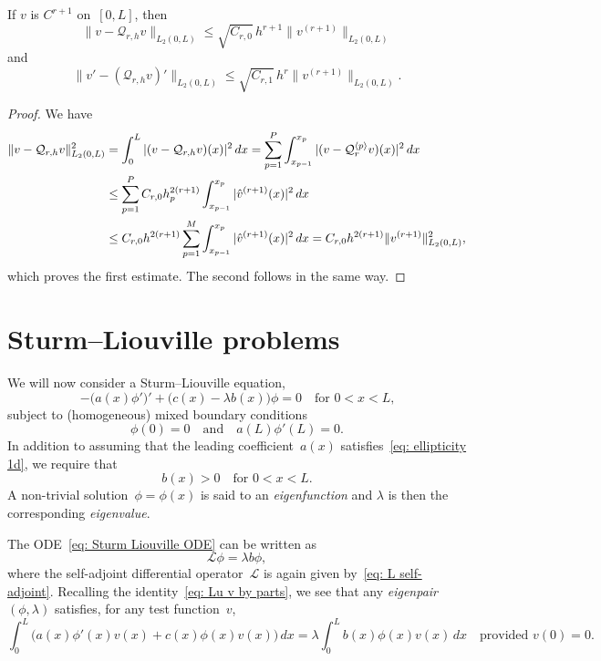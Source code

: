 \begin{theorem}
If $v$ is $C^{r+1}$ on~$[0,L]$, then
\[
\|v-\mathcal{Q}_{r,h}v\|_{L_2(0,L)}
    \le\sqrt{C_{r,0}}\,h^{r+1}\|v^{(r+1)}\|_{L_2(0,L)}
\]
and
\[
\|v'-(\mathcal{Q}_{r,h}v)'\|_{L_2(0,L)}
    \le\sqrt{C_{r,1}}\,h^r\|v^{(r+1)}\|_{L_2(0,L)}.
\]
\end{theorem}
\begin{proof}
We have
\begin{align*}
\|v-\mathcal{Q}_{r,h}v\|_{L_2(0,L)}^2
    &=\int_0^L|(v-\mathcal{Q}_{r,h}v)(x)|^2\,dx=\sum_{p=1}^P
    \int_{x_{p-1}}^{x_p}|(v-\mathcal{Q}_r^{\langle p\rangle}v)(x)|^2\,dx\\
    &\le\sum_{p=1}^P C_{r,0}h_p^{2(r+1)}\int_{x_{p-1}}^{x_p}
        |\hat v^{(r+1)}(x)|^2\,dx\\
    &\le C_{r,0}h^{2(r+1)}\sum_{p=1}^M\int_{x_{p-1}}^{x_p} 
        |\hat v^{(r+1)}(x)|^2\,dx
    =C_{r,0}h^{2(r+1)}\|v^{(r+1)}\|_{L_2(0,L)}^2,
\end{align*}
which proves the first estimate.  The second follows in the same way.
\end{proof}

\section{Sturm--Liouville problems}\label{sec: Sturm-Liouville}

We will now consider a Sturm--Liouville equation,
\begin{equation}\label{eq: Sturm Liouville ODE}
-\bigl(a(x)\phi'\bigr)'+\bigl(c(x)-\lambda b(x)\bigr)\phi=0\quad
	\text{for $0<x<L$,}
\end{equation}
subject to (homogeneous) mixed boundary conditions
\begin{equation}\label{eq: Sturm Liouville bc}
\phi(0)=0\quad\text{and}\quad a(L)\phi'(L)=0.
\end{equation}
In addition to assuming that the leading coefficient~$a(x)$ 
satisfies~\eqref{eq: ellipticity 1d}, we require that
\begin{equation}\label{eq: b>0}
b(x)>0\quad\text{for $0<x<L$.}
\end{equation}
A non-trivial solution~$\phi=\phi(x)$ is said to an \emph{eigenfunction} and 
$\lambda$ is then the corresponding \emph{eigenvalue}.  

The ODE~\eqref{eq: Sturm Liouville ODE} can be written as
\[
\mathcal{L}\phi=\lambda b\phi,
\]
where the self-adjoint differential operator~$\mathcal{L}$ is again given 
by~\eqref{eq: L self-adjoint}.  Recalling the 
identity~\eqref{eq: Lu v by parts}, we see that any \emph{eigenpair} 
$(\phi,\lambda)$ satisfies, for any test function~$v$,
\[
\int_0^L\bigl(a(x)\phi'(x)v(x)+c(x)\phi(x)v(x)\bigr)\,dx
	=\lambda\int_0^Lb(x)\phi(x)v(x)\,dx
\quad\text{provided $v(0)=0$.}
\]

